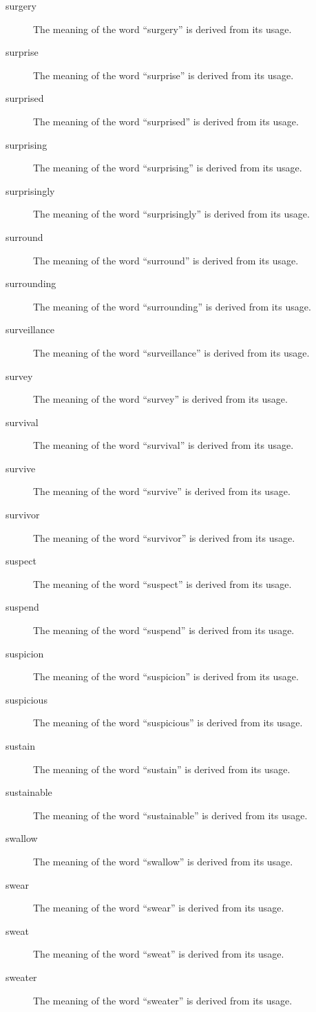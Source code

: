 \documentclass[12pt, letterpaper]{memoir}
\begin{document}
\begin{description}
\item[surgery] The meaning of the word ``surgery'' is derived from its usage.
\item[surprise] The meaning of the word ``surprise'' is derived from its usage.
\item[surprised] The meaning of the word ``surprised'' is derived from its usage.
\item[surprising] The meaning of the word ``surprising'' is derived from its usage.
\item[surprisingly] The meaning of the word ``surprisingly'' is derived from its usage.
\item[surround] The meaning of the word ``surround'' is derived from its usage.
\item[surrounding] The meaning of the word ``surrounding'' is derived from its usage.
\item[surveillance] The meaning of the word ``surveillance'' is derived from its usage.
\item[survey] The meaning of the word ``survey'' is derived from its usage.
\item[survival] The meaning of the word ``survival'' is derived from its usage.
\item[survive] The meaning of the word ``survive'' is derived from its usage.
\item[survivor] The meaning of the word ``survivor'' is derived from its usage.
\item[suspect] The meaning of the word ``suspect'' is derived from its usage.
\item[suspend] The meaning of the word ``suspend'' is derived from its usage.
\item[suspicion] The meaning of the word ``suspicion'' is derived from its usage.
\item[suspicious] The meaning of the word ``suspicious'' is derived from its usage.
\item[sustain] The meaning of the word ``sustain'' is derived from its usage.
\item[sustainable] The meaning of the word ``sustainable'' is derived from its usage.
\item[swallow] The meaning of the word ``swallow'' is derived from its usage.
\item[swear] The meaning of the word ``swear'' is derived from its usage.
\item[sweat] The meaning of the word ``sweat'' is derived from its usage.
\item[sweater] The meaning of the word ``sweater'' is derived from its usage.

\end{description}
\end{document}
